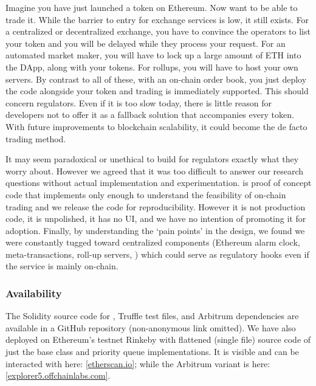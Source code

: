 Imagine you have just launched a token on Ethereum. Now want to be able to trade it. While the barrier to entry for exchange services is low, it still exists. For a centralized or decentralized exchange, you have to convince the operators to list your token and you will be delayed while they process your request. For an automated market maker, you will have to lock up a large amount of ETH into the DApp, along with your tokens. For rollups, you will have to host your own servers. By contrast to all of these, with an on-chain order book, you just deploy the code alongside your token and trading is immediately supported. This should concern regulators. Even if it is too slow today, there is little reason for developers not to offer it as a fallback solution that accompanies every token. With future improvements to blockchain scalability, it could become the de facto trading method. 

It may seem paradoxical or unethical to build for regulators exactly what they worry about. However we agreed that it was too difficult to answer our research questions without actual implementation and experimentation. \cm is proof of concept code that implements only enough to understand the feasibility of on-chain trading and we release the code for reproducibility. However it is not production code, it is unpolished, it has no UI, and we have no intention of promoting it for adoption. Finally, by understanding the `pain points' in the design, we found we were constantly tugged toward centralized components (Ethereum alarm clock, meta-transactions, roll-up servers, \etc) which could serve as regulatory hooks even if the service is mainly on-chain.
 
 \subsubsection*{Availability} 
The Solidity source code for \cm, Truffle test files, and Arbitrum dependencies are available in a GitHub repository (non-anonymous link omitted). We have also deployed \cm on Ethereum's testnet Rinkeby with flattened (single file) source code of just the \cm base class and priority queue implementations. It is visible and can be interacted with here: \href{https://rinkeby.etherscan.io/address/0x0d91de29c531d074853a5cef7cf9dfeb9c6ec4e0}{[etherscan.io]}; while the Arbitrum variant is here: \href{https://explorer5.arbitrum.io/#/address/0xce17be19aa80396ae1a1c9f8dd386c48c1533f52}{[explorer5.offchainlabs.com]}.
 
